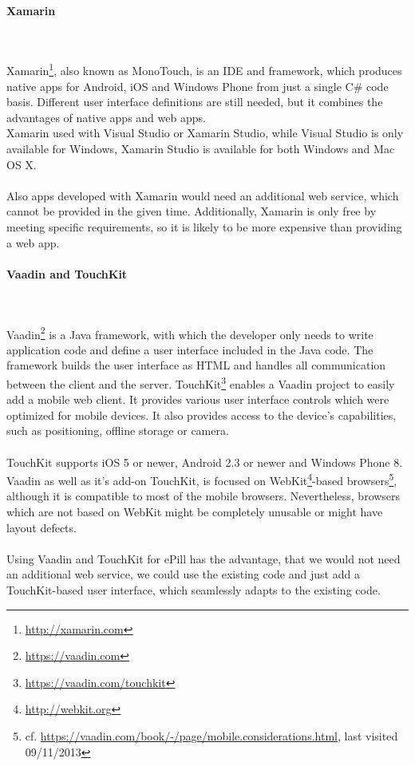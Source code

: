 \paragraph{Xamarin}$\;$

\vspace{0.75em}
Xamarin\footnote{\url{http://xamarin.com}}, also known as MonoTouch, is an IDE and framework, which produces native apps for Android, iOS and Windows Phone from just a single C\# code basis. Different user interface definitions are still needed, but it combines the advantages of native apps and web apps. 
\\
Xamarin used with Visual Studio or Xamarin Studio, while Visual Studio is only available for Windows, Xamarin Studio is available for both Windows and Mac OS X.
\\
\\
Also apps developed with Xamarin would need an additional web service, which cannot be provided in the given time. Additionally, Xamarin is only free by meeting specific requirements, so it is likely to be more expensive than providing a web app.

\paragraph{Vaadin and TouchKit}$\;$

\vspace{0.75em}
Vaadin\footnote{\url{https://vaadin.com}} is a Java framework, with which the developer only needs to write application code and define a user interface included in the Java code. The framework builds the user interface as HTML and handles all communication between the client and the server. TouchKit\footnote{\url{https://vaadin.com/touchkit}} enables a Vaadin project to easily add a mobile web client. It provides various user interface controls which were optimized for mobile devices. It also provides access to the device's capabilities, such as positioning, offline storage or camera.
\\
\\
TouchKit supports iOS 5 or newer, Android 2.3 or newer and Windows Phone 8. Vaadin as well as it's add-on TouchKit, is focused on WebKit\footnote{\url{http://webkit.org}}-based browsers\footnote{cf. \url{https://vaadin.com/book/-/page/mobile.considerations.html}, last visited 09/11/2013}, although it is compatible to most of the mobile browsers. Nevertheless, browsers which are not based on WebKit might be completely unusable or might have layout defects.
\\
\\
Using Vaadin and TouchKit for ePill has the advantage, that we would not need an additional web service, we could use the existing code and just add a TouchKit-based user interface, which seamlessly adapts to the existing code.

